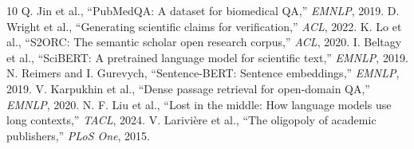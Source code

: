 \documentclass[sigconf]{acmart}
\begin{document}
\begin{thebibliography}{10}
 Q. Jin et al., ``PubMedQA: A dataset for biomedical QA,'' \emph{EMNLP}, 2019.
 D. Wright et al., ``Generating scientific claims for verification,'' \emph{ACL}, 2022.
 K. Lo et al., ``S2ORC: The semantic scholar open research corpus,'' \emph{ACL}, 2020.
 I. Beltagy et al., ``SciBERT: A pretrained language model for scientific text,'' \emph{EMNLP}, 2019.
 N. Reimers and I. Gurevych, ``Sentence-BERT: Sentence embeddings,'' \emph{EMNLP}, 2019.
 V. Karpukhin et al., ``Dense passage retrieval for open-domain QA,'' \emph{EMNLP}, 2020.
 N. F. Liu et al., ``Lost in the middle: How language models use long contexts,'' \emph{TACL}, 2024.
 V. Larivi{\`e}re et al., ``The oligopoly of academic publishers,'' \emph{PLoS One}, 2015.
\end{thebibliography}
\end{document}
